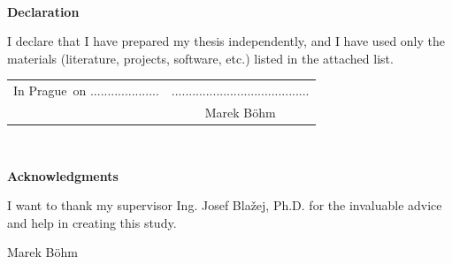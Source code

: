 \documentclass[a4paper,twoside,12pt]{book}
\newcommand{\tb}{\textbf} %
\newcommand{\autor}{Marek Böhm}   %
\newcommand{\kde}{Prague} %
\newcommand{\prohlaseni}{I declare that I have prepared my thesis independently, and I have used only the materials (literature, projects, software, etc.) listed in the attached list.} %
\newcommand{\podekovani}{I want to thank my supervisor Ing. Josef Blažej, Ph.D. for the invaluable advice and help in creating this study.} %
\begin{document}
\newpage %
\thispagestyle{empty}  %

~ %
\vfill %

\tb{Declaration} %

\vspace{1em} %
\prohlaseni

\vspace{2em}  %
\hspace{-0.5em}\begin{tabularx}{\textwidth}{X c}  %
In \kde\ on .................... &........................................ \\	%
	& \autor
\end{tabularx}	%


\newpage
\thispagestyle{empty}

~
\vfill %


\tb{Acknowledgments}

\vspace{1em} %
\podekovani
\begin{flushright}
\autor
\end{flushright}  %


\newpage   %
\thispagestyle{empty}   %

\newbox\odstavecbox
\newlength\vyskaodstavce
\newcommand\odstavec[2]{%
    \setbox\odstavecbox=\hbox{%
         \parbox[t]{#1}{#2\vrule width 0pt depth 4pt}}%
    \global\vyskaodstavce=\dp\odstavecbox
    \box\odstavecbox}
\newcommand{\delka}{120mm} %
\end{document}
